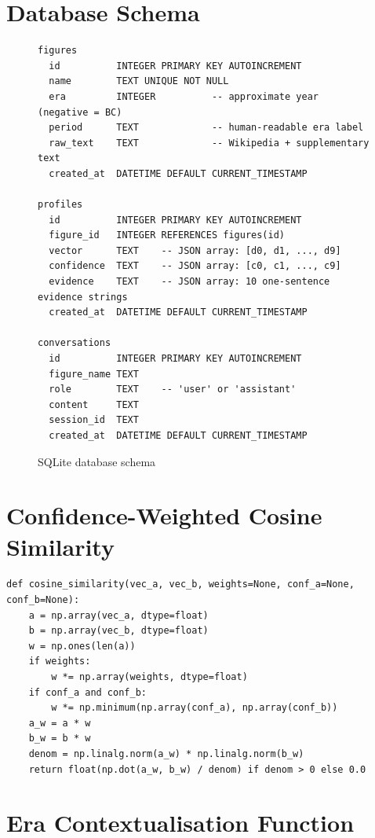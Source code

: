 \documentclass[11pt, a4paper]{report}
\begin{document}
\section{Database Schema}

\begin{figure}[H]
  \centering
  \begin{lstlisting}
figures
  id          INTEGER PRIMARY KEY AUTOINCREMENT
  name        TEXT UNIQUE NOT NULL
  era         INTEGER          -- approximate year (negative = BC)
  period      TEXT             -- human-readable era label
  raw_text    TEXT             -- Wikipedia + supplementary text
  created_at  DATETIME DEFAULT CURRENT_TIMESTAMP

profiles
  id          INTEGER PRIMARY KEY AUTOINCREMENT
  figure_id   INTEGER REFERENCES figures(id)
  vector      TEXT    -- JSON array: [d0, d1, ..., d9]
  confidence  TEXT    -- JSON array: [c0, c1, ..., c9]
  evidence    TEXT    -- JSON array: 10 one-sentence evidence strings
  created_at  DATETIME DEFAULT CURRENT_TIMESTAMP

conversations
  id          INTEGER PRIMARY KEY AUTOINCREMENT
  figure_name TEXT
  role        TEXT    -- 'user' or 'assistant'
  content     TEXT
  session_id  TEXT
  created_at  DATETIME DEFAULT CURRENT_TIMESTAMP
  \end{lstlisting}
  \caption{SQLite database schema}
  \label{fig:schema}
\end{figure}

\section{Confidence-Weighted Cosine Similarity}

\begin{lstlisting}[caption={Confidence-weighted cosine similarity (matcher.py)}, label={lst:similarity}]
def cosine_similarity(vec_a, vec_b, weights=None, conf_a=None, conf_b=None):
    a = np.array(vec_a, dtype=float)
    b = np.array(vec_b, dtype=float)
    w = np.ones(len(a))
    if weights:
        w *= np.array(weights, dtype=float)
    if conf_a and conf_b:
        w *= np.minimum(np.array(conf_a), np.array(conf_b))
    a_w = a * w
    b_w = b * w
    denom = np.linalg.norm(a_w) * np.linalg.norm(b_w)
    return float(np.dot(a_w, b_w) / denom) if denom > 0 else 0.0
\end{lstlisting}

\section{Era Contextualisation Function}
\end{document}

